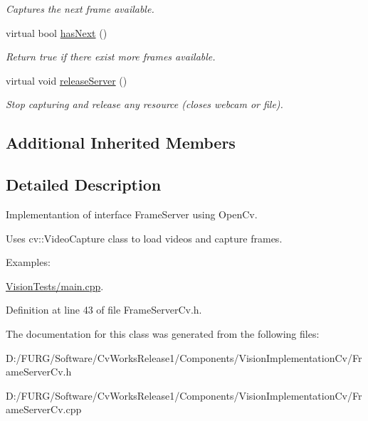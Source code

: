 \begin{DoxyCompactItemize}
\begin{DoxyCompactList}\small\item\em Captures the next frame available. \end{DoxyCompactList}\item 
\hypertarget{class_viscv_1_1_frame_server_cv_a634d758e1811c32295f5665e4f8a0178}{}virtual bool \hyperlink{class_viscv_1_1_frame_server_cv_a634d758e1811c32295f5665e4f8a0178}{has\+Next} ()\label{class_viscv_1_1_frame_server_cv_a634d758e1811c32295f5665e4f8a0178}

\begin{DoxyCompactList}\small\item\em Return true if there exist more frames available. \end{DoxyCompactList}\item 
\hypertarget{class_viscv_1_1_frame_server_cv_a881a1dc380e3eaa60c36716d8488cdbf}{}virtual void \hyperlink{class_viscv_1_1_frame_server_cv_a881a1dc380e3eaa60c36716d8488cdbf}{release\+Server} ()\label{class_viscv_1_1_frame_server_cv_a881a1dc380e3eaa60c36716d8488cdbf}

\begin{DoxyCompactList}\small\item\em Stop capturing and release any resource (closes webcam or file). \end{DoxyCompactList}\end{DoxyCompactItemize}
\subsection*{Additional Inherited Members}


\subsection{Detailed Description}
Implementantion of interface Frame\+Server using Open\+Cv. 

Uses cv\+::\+Video\+Capture class to load videos and capture frames. \begin{Desc}
\item[Examples\+: ]\par
\hyperlink{_vision_tests_2main_8cpp-example}{Vision\+Tests/main.\+cpp}.\end{Desc}


Definition at line 43 of file Frame\+Server\+Cv.\+h.



The documentation for this class was generated from the following files\+:\begin{DoxyCompactItemize}
\item 
D\+:/\+F\+U\+R\+G/\+Software/\+Cv\+Works\+Release1/\+Components/\+Vision\+Implementation\+Cv/Frame\+Server\+Cv.\+h\item 
D\+:/\+F\+U\+R\+G/\+Software/\+Cv\+Works\+Release1/\+Components/\+Vision\+Implementation\+Cv/Frame\+Server\+Cv.\+cpp\end{DoxyCompactItemize}
